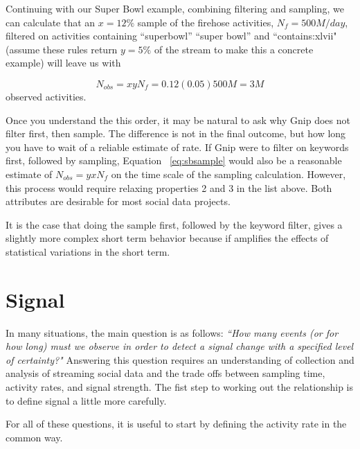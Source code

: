\documentclass{article}
\begin{document}
Continuing with our Super Bowl example, combining filtering and sampling, we can calculate that an $x=12\%$ sample of the firehose activities, $N_f=500M/day$, filtered on activities containing ``superbowl'' ``super bowl'' and ``contains:xlvii" (assume these rules return $y=5\%$ of the stream to make this a concrete example) will leave us with

\begin{equation}
    \label{eq:sbsample}
    N_{obs} = x y N_f = 0.12 (0.05) 500M = 3M
\end{equation}
observed activities. 

Once you understand the this order, it may be natural to ask why Gnip does not filter first, then sample. The difference is not in the final outcome, but how long you have to wait of a reliable estimate of rate. If Gnip were to filter on keywords first, followed by sampling, Equation ~\ref{eq:sbsample} would also be a reasonable estimate of $N_{obs} = y x N_f$ on the time scale of the sampling calculation. However, this process would require relaxing properties 2 and 3 in the list above. Both attributes are desirable for most social data projects.

It is the case that doing the sample first, followed by the keyword filter, gives a slightly more complex short term behavior because if amplifies the effects of statistical variations in the short term.

\section{Signal} 

In many situations, the main question is as follows: \emph{``How many events (or for how long) must we observe in order to detect a signal change with a specified level of certainty?"} Answering this question requires an understanding of collection and analysis of streaming social data and the trade offs between sampling time, activity rates, and signal strength.  The fist step to working out the relationship is to define signal a little more carefully.


For all of these questions, it is useful to start by defining the activity rate in the common way.
\end{document}
